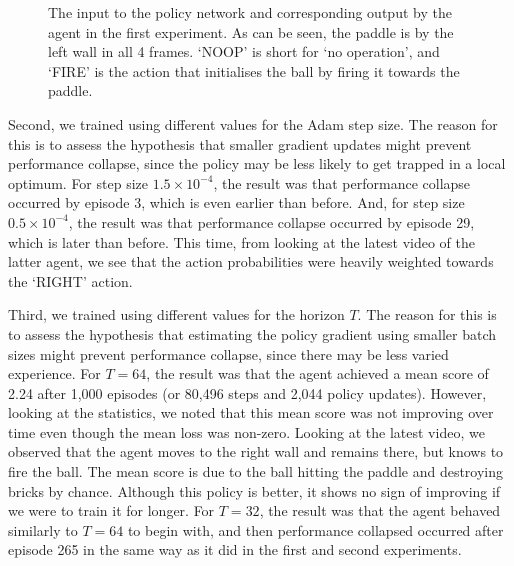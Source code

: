 \documentclass[12pt,a4paper]{article}
\begin{document}
\begin{figure}[ht]
    \centering
    \hfill
    \caption{The input to the policy network and corresponding output by the agent in the first experiment. As can be seen, the paddle is by the left wall in all 4 frames. `NOOP' is short for `no operation', and `FIRE' is the action that initialises the ball by firing it towards the paddle.}
\end{figure}

Second, we trained using different values for the Adam step size. The reason for this is to assess the hypothesis that smaller gradient updates might prevent performance collapse, since the policy may be less likely to get trapped in a local optimum. For step size $1.5 \times 10^{-4}$, the result was that performance collapse occurred by episode 3, which is even earlier than before. And, for step size $0.5 \times 10^{-4}$, the result was that performance collapse occurred by episode 29, which is later than before. This time, from looking at the latest video of the latter agent, we see that the action probabilities were heavily weighted towards the `RIGHT' action. 

Third, we trained using different values for the horizon $T$. The reason for this is to assess the hypothesis that estimating the policy gradient using smaller batch sizes might prevent performance collapse, since there may be less varied experience. For $T=64$, the result was that the agent achieved a mean score of 2.24 after 1,000 episodes (or 80,496 steps and 2,044 policy updates). However, looking at the statistics, we noted that this mean score was not improving over time even though the mean loss was non-zero. Looking at the latest video, we observed that the agent moves to the right wall and remains there, but knows to fire the ball. The mean score is due to the ball hitting the paddle and destroying bricks by chance. Although this policy is better, it shows no sign of improving if we were to train it for longer. For $T=32$, the result was that the agent behaved similarly to $T=64$ to begin with, and then performance collapsed occurred after episode 265 in the same way as it did in the first and second experiments.
\end{document}
